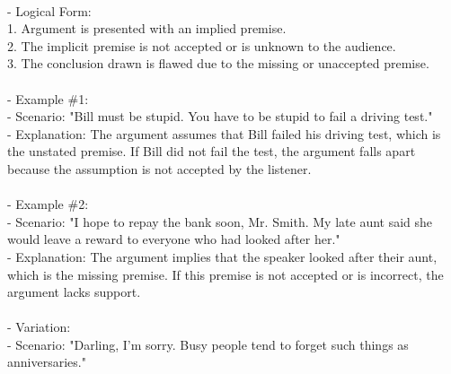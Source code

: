 \documentclass[a4paper,12pt,single,pdftex]{scrartcl}
\begin{document}
    \\

    
      - Logical Form:
    \\

    
        1. Argument is presented with an implied premise. 
    \\

    
        2. The implicit premise is not accepted or is unknown to the audience. 
    \\

    
        3. The conclusion drawn is flawed due to the missing or unaccepted premise. 
    \\

    
      
    \\

    
      - Example \#1:
    \\

    
        - Scenario: "Bill must be stupid. You have to be stupid to fail a driving test." 
    \\

    
        - Explanation: The argument assumes that Bill failed his driving test, which is the unstated premise. If Bill did not fail the test, the argument falls apart because the assumption is not accepted by the listener. 
    \\

    
      
    \\

    
      - Example \#2:
    \\

    
        - Scenario: "I hope to repay the bank soon, Mr. Smith. My late aunt said she would leave a reward to everyone who had looked after her." 
    \\

    
        - Explanation: The argument implies that the speaker looked after their aunt, which is the missing premise. If this premise is not accepted or is incorrect, the argument lacks support. 
    \\

    
      
    \\

    
      - Variation:
    \\

    
        - Scenario: "Darling, I'm sorry. Busy people tend to forget such things as anniversaries." 
    \\
\end{document}
